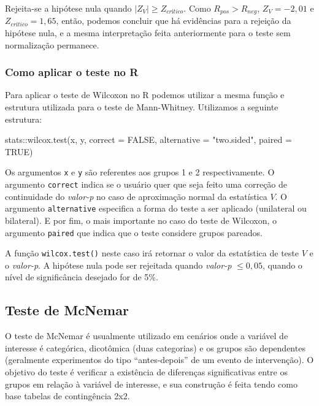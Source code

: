\documentclass[
  letterpaper,
  DIV=11,
  numbers=noendperiod]{scrreprt}
\newenvironment{Shaded}{\begin{snugshade}}{\end{snugshade}}
\newcommand{\AttributeTok}[1]{\textcolor[rgb]{0.40,0.45,0.13}{#1}}
\newcommand{\ConstantTok}[1]{\textcolor[rgb]{0.56,0.35,0.01}{#1}}
\newcommand{\FunctionTok}[1]{\textcolor[rgb]{0.28,0.35,0.67}{#1}}
\newcommand{\NormalTok}[1]{\textcolor[rgb]{0.00,0.23,0.31}{#1}}
\newcommand{\SpecialCharTok}[1]{\textcolor[rgb]{0.37,0.37,0.37}{#1}}
\newcommand{\StringTok}[1]{\textcolor[rgb]{0.13,0.47,0.30}{#1}}
\begin{document}
Rejeita-se a hipótese nula quando \(|Z_V|\geq Z_{crítico}\). Como
\(R_{pos} > R_{neg}\), \(Z_V = -2,01\) e \(Z_{crítico} = 1,65\), então,
podemos concluir que há evidências para a rejeição da hipótese nula, e a
mesma interpretação feita anteriormente para o teste sem normalização
permanece.

\hypertarget{como-aplicar-o-teste-no-r-3}{%
\subsubsection{Como aplicar o teste no
R}\label{como-aplicar-o-teste-no-r-3}}

Para aplicar o teste de Wilcoxon no R podemos utilizar a mesma função e
estrutura utilizada para o teste de Mann-Whitney. Utilizamos a seguinte
estrutura:

\begin{Shaded}
\begin{Highlighting}[]
\NormalTok{stats}\SpecialCharTok{::}\FunctionTok{wilcox.test}\NormalTok{(x, y, }\AttributeTok{correct =} \ConstantTok{FALSE}\NormalTok{,  }\AttributeTok{alternative =} \StringTok{"two.sided"}\NormalTok{, }\AttributeTok{paired =} \ConstantTok{TRUE}\NormalTok{)}
\end{Highlighting}
\end{Shaded}

Os argumentos \texttt{x} e \texttt{y} são referentes aos grupos 1 e 2
respectivamente. O argumento \texttt{correct} indica se o usuário quer
que seja feito uma correção de continuidade do \emph{valor-p} no caso de
aproximação normal da estatística \(V\). O argumento
\texttt{alternative} especifica a forma do teste a ser aplicado
(unilateral ou bilateral). E por fim, o mais importante no caso do teste
de Wilcoxon, o argumento \texttt{paired} que indica que o teste
considere grupos pareados.

A função \texttt{wilcox.test()} neste caso irá retornar o valor da
estatística de teste \(V\) e o \emph{valor-p}. A hipótese nula pode ser
rejeitada quando \emph{valor-p} \(\leq 0,05\), quando o nível de
significância desejado for de 5\%.

\hypertarget{teste-de-mcnemar}{%
\subsection{Teste de McNemar}\label{teste-de-mcnemar}}

O teste de McNemar é usualmente utilizado em cenários onde a variável de
interesse é categórica, dicotômica (duas categorias) e os grupos são
dependentes (geralmente experimentos do tipo ``antes-depois'' de um
evento de intervenção). O objetivo do teste é verificar a existência de
diferenças significativas entre os grupos em relação à variável de
interesse, e sua construção é feita tendo como base tabelas de
contingência 2x2.
\end{document}
